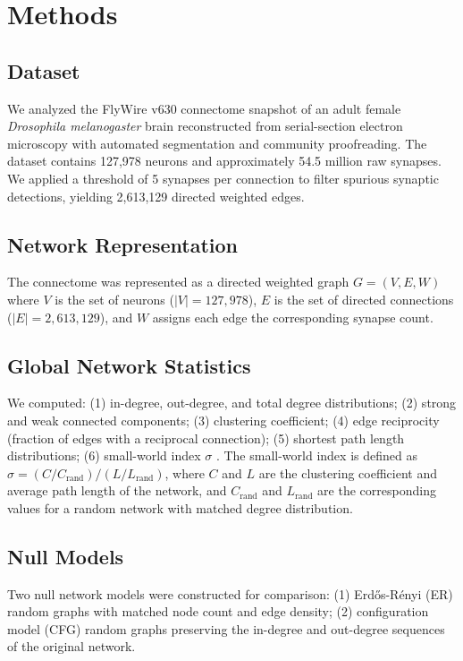 \documentclass[11pt]{article}
\begin{document}
\section{Methods}

\subsection{Dataset}
We analyzed the FlyWire v630 connectome snapshot of an adult female \textit{Drosophila melanogaster} brain reconstructed from serial-section electron microscopy with automated segmentation and community proofreading. The dataset contains 127,978 neurons and approximately 54.5 million raw synapses. We applied a threshold of 5 synapses per connection to filter spurious synaptic detections, yielding 2,613,129 directed weighted edges.

\subsection{Network Representation}
The connectome was represented as a directed weighted graph $G = (V, E, W)$ where $V$ is the set of neurons ($|V| = 127{,}978$), $E$ is the set of directed connections ($|E| = 2{,}613{,}129$), and $W$ assigns each edge the corresponding synapse count.

\subsection{Global Network Statistics}
We computed: (1) in-degree, out-degree, and total degree distributions; (2) strong and weak connected components; (3) clustering coefficient; (4) edge reciprocity (fraction of edges with a reciprocal connection); (5) shortest path length distributions; (6) small-world index $\sigma$ \citep{humphries2008network}. The small-world index is defined as $\sigma = (C/C_{\text{rand}}) / (L/L_{\text{rand}})$, where $C$ and $L$ are the clustering coefficient and average path length of the network, and $C_{\text{rand}}$ and $L_{\text{rand}}$ are the corresponding values for a random network with matched degree distribution.

\subsection{Null Models}
Two null network models were constructed for comparison: (1) Erd\H{o}s-R\'{e}nyi (ER) random graphs with matched node count and edge density; (2) configuration model (CFG) random graphs preserving the in-degree and out-degree sequences of the original network.
\end{document}
